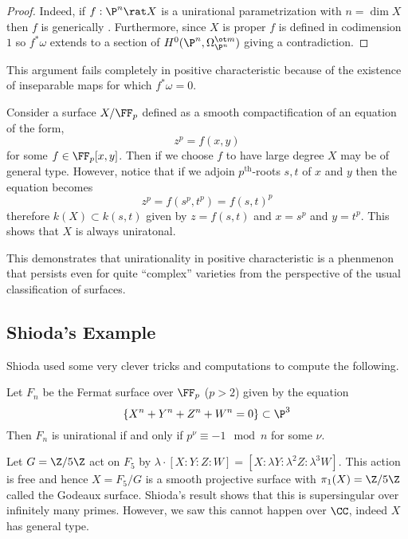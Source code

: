 \documentclass[12pt]{article}
\begin{document}
\begin{proof}
Indeed, if $f : \P^n \rat X$ is a unirational parametrization with $n = \dim{X}$ then $f$ is generically \etale. Furthermore, since $X$ is proper $f$ is defined in codimension $1$ so $f^* \omega$ extends to a section of $H^0(\P^n, \Omega_{\P^n}^{\ot m})$ giving a contradiction. 
\end{proof}

This argument fails completely in positive characteristic because of the existence of inseparable maps for which $f^* \omega = 0$.

\begin{example}
Consider a surface $X / \FF_p$ defined as a smooth compactification of an equation of the form,
\[ z^p = f(x,y) \]
for some $f \in \FF_p[x,y]$. Then if we choose $f$ to have large degree $X$ may be of general type. However, notice that if we adjoin $p^{\text{th}}$-roots $s,t$ of $x$ and $y$ then the equation becomes
\[ z^p = f(s^p, t^p) = f(s,t)^p \]
therefore $k(X) \subset k(s,t)$ given by $z = f(s,t)$ and $x = s^p$ and $y = t^p$. This shows that $X$ is always uniratonal. 
\end{example}

This demonstrates that unirationality in positive characteristic is a phenmenon that persists even for quite ``complex'' varieties from the perspective of the usual classification of surfaces. 

\subsection{Shioda's Example}

Shioda used some very clever tricks and computations to compute the following.

\begin{theorem}[Shioda]
Let $F_n$ be the Fermat surface over $\FF_p$ ($p > 2$) given by the equation
\[ \{ X^n + Y^n + Z^n + W^n = 0 \} \subset \P^3 \]
Then $F_n$ is unirational if and only if $p^\nu \equiv -1 \mod n$ for some $\nu$.
\end{theorem}

\begin{example}
Let $G = \Z / 5 \Z$ act on $F_5$ by $\lambda \cdot [X : Y : Z : W] = [X : \lambda Y : \lambda^2 Z : \lambda^3 W]$. This action is free and hence $X = F_5 / G$ is a smooth projective surface with $\pi_1(X) = \Z / 5 \Z$ called the Godeaux surface. Shioda's result shows that this is supersingular over infinitely many primes. However, we saw this cannot happen over $\CC$, indeed $X$ has general type. 
\end{example}
\end{document}
